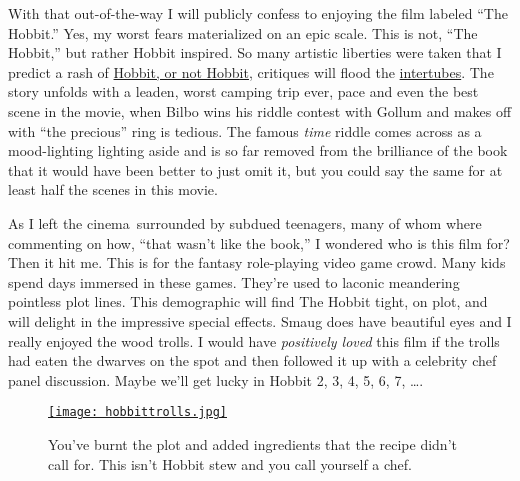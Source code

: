 With that out-of-the-way I will publicly confess to enjoying the film
labeled ``The Hobbit.'' Yes, my worst fears materialized on an epic
scale. This is not, ``The Hobbit,'' but rather Hobbit inspired. So many
artistic liberties were taken that I predict a rash of
\href{http://www.librarything.com/topic/146051}{Hobbit, or not Hobbit},
critiques will flood the
\href{http://www.urbandictionary.com/define.php?term=intertubes}{intertubes}.
The story unfolds with a leaden, worst camping trip ever, pace and even
the best scene in the movie, when Bilbo wins his riddle contest with
Gollum and makes off with ``the precious'' ring is tedious. The famous
\emph{time} riddle comes across as a mood-lighting lighting aside and is
so far removed from the brilliance of the book that it would have been
better to just omit it, but you could say the same for at least half
the scenes in this movie.

As I left the cinema~surrounded by subdued teenagers, many of whom where
commenting on how, ``that wasn't like the book,'' I wondered who is this
film for? Then it hit me. This is for the fantasy role-playing video
game crowd. Many kids spend days immersed in these games. They're used
to laconic meandering pointless plot lines. This demographic will find
The Hobbit tight, on plot, and will delight in the impressive special
effects. Smaug does have beautiful eyes and I really enjoyed the wood
trolls. I would have \emph{positively loved} this film if the trolls had
eaten the dwarves on the spot and then followed it up with a celebrity
chef panel discussion. Maybe we'll get lucky in Hobbit 2, 3, 4, 5, 6, 7,
\ldots{}.



\captionsetup[figure]{labelformat=empty}
\begin{figure}[htbp]
\centering
\href{http://bakerjd99.wordpress.com/2012/12/16/king-hobbit-kong/hobbittrolls/}{\texttt{[image: hobbittrolls.jpg]}}
\caption{You've burnt the plot and added ingredients that the recipe didn't call
for. This isn't Hobbit stew and you call yourself a chef.}
\label{fig:3538X0}
\end{figure}





%